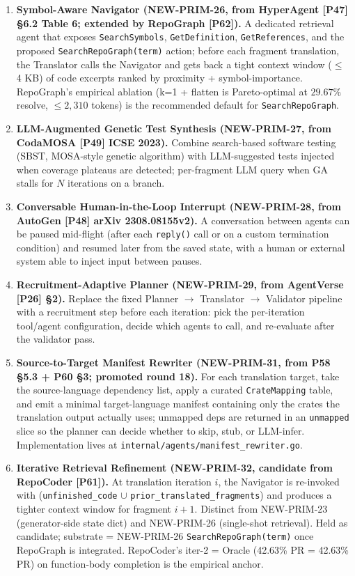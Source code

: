 \begin{enumerate}
\item \textbf{Symbol-Aware Navigator (NEW-PRIM-26, from HyperAgent [P47] \S6.2 Table 6; extended by RepoGraph [P62]).}
A dedicated retrieval agent that exposes \texttt{SearchSymbols}, \texttt{GetDefinition}, \texttt{GetReferences}, and the proposed \texttt{SearchRepoGraph(term)} action; before each fragment translation, the Translator calls the Navigator and gets back a tight context window ($\le$ 4 KB) of code excerpts ranked by proximity + symbol-importance. RepoGraph's empirical ablation (k=1 + flatten is Pareto-optimal at $29.67\%$ resolve, $\le 2{,}310$ tokens) is the recommended default for \texttt{SearchRepoGraph}.

\item \textbf{LLM-Augmented Genetic Test Synthesis (NEW-PRIM-27, from CodaMOSA [P49] ICSE 2023).}
Combine search-based software testing (SBST, MOSA-style genetic algorithm) with LLM-suggested tests injected when coverage plateaus are detected; per-fragment LLM query when GA stalls for $N$ iterations on a branch.

\item \textbf{Conversable Human-in-the-Loop Interrupt (NEW-PRIM-28, from AutoGen [P48] arXiv 2308.08155v2).}
A conversation between agents can be paused mid-flight (after each \texttt{reply()} call or on a custom termination condition) and resumed later from the saved state, with a human or external system able to inject input between pauses.

\item \textbf{Recruitment-Adaptive Planner (NEW-PRIM-29, from AgentVerse [P26] \S2).}
Replace the fixed Planner $\rightarrow$ Translator $\rightarrow$ Validator pipeline with a recruitment step before each iteration: pick the per-iteration tool/agent configuration, decide which agents to call, and re-evaluate after the validator pass.

\item \textbf{Source-to-Target Manifest Rewriter (NEW-PRIM-31, from P58 \S5.3 + P60 \S3; promoted round 18).}
For each translation target, take the source-language dependency list, apply a curated \texttt{CrateMapping} table, and emit a minimal target-language manifest containing only the crates the translation output actually uses; unmapped deps are returned in an \texttt{unmapped} slice so the planner can decide whether to skip, stub, or LLM-infer. Implementation lives at \texttt{internal/agents/manifest\_rewriter.go}.

\item \textbf{Iterative Retrieval Refinement (NEW-PRIM-32, candidate from RepoCoder [P61]).}
At translation iteration $i$, the Navigator is re-invoked with (\texttt{unfinished\_code} $\cup$ \texttt{prior\_translated\_fragments}) and produces a tighter context window for fragment $i+1$. Distinct from NEW-PRIM-23 (generator-side state dict) and NEW-PRIM-26 (single-shot retrieval). Held as candidate; substrate = NEW-PRIM-26 \texttt{SearchRepoGraph(term)} once RepoGraph is integrated. RepoCoder's iter-2 = Oracle (42.63\% PR = 42.63\% PR) on function-body completion is the empirical anchor.

\end{enumerate}

